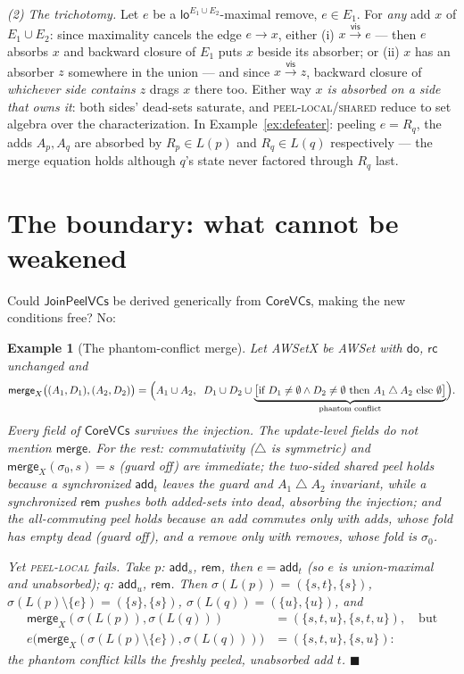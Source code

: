 \documentclass[11pt]{article}
\newtheorem{example}[theorem]{Example}
\newcommand{\vis}{\xrightarrow{\mathsf{vis}}}
\newcommand{\add}{\mathsf{add}}
\newcommand{\rem}{\mathsf{rem}}
\newcommand{\Merge}{\mathsf{merge}}
\newcommand{\Sinit}{\sigma_0}
\newcommand{\loE}[1]{\mathsf{lo}^{#1}}
\newcommand{\co}{\mathsf{CoreVCs}}
\newcommand{\jp}{\mathsf{JoinPeelVCs}}
\begin{document}
\emph{(2) The trichotomy.} Let $e$ be a $\loE{E_1\cup E_2}$-maximal
remove, $e \in E_1$. For \emph{any} add $x$ of $E_1 \cup E_2$: since
maximality cancels the edge $e \to x$, either
(i) $x \vis e$ --- then $e$ absorbs $x$ and backward closure of $E_1$
puts $x$ beside its absorber; or
(ii) $x$ has an absorber $z$ somewhere in the union --- and since
$x \vis z$, backward closure of \emph{whichever side contains $z$} drags
$x$ there too. Either way \emph{$x$ is absorbed on a side that owns it}:
both sides' dead-sets saturate, and \textsc{peel-local}/\textsc{shared}
reduce to set algebra over the characterization. In
Example~\ref{ex:defeater}: peeling $e = R_q$, the adds $A_p, A_q$ are
absorbed by $R_p \in L(p)$ and $R_q \in L(q)$ respectively --- the merge
equation holds although $q$'s state never factored through $R_q$ last.

\section{The boundary: what cannot be weakened}
\label{sec:boundary}

Could $\jp$ be derived generically from $\co$, making the new conditions
free? No:

\begin{example}[The phantom-conflict merge]
\label{ex:phantom}
Let \textsf{AWSetX} be \textsf{AWSet} with $\mathsf{do}$, $\mathsf{rc}$
unchanged and
\[
\Merge_X\bigl((A_1,D_1),(A_2,D_2)\bigr) =
\Bigl(A_1 \cup A_2,\;\; D_1 \cup D_2 \cup
\underbrace{\bigl[\text{if } D_1 \neq \emptyset \wedge D_2 \neq \emptyset
\text{ then } A_1 \mathbin{\triangle} A_2 \text{ else } \emptyset\bigr]}_{\text{phantom conflict}}\Bigr).
\]
Every field of $\co$ survives the injection. The update-level fields do
not mention $\Merge$. For the rest: commutativity ($\triangle$ is
symmetric) and $\Merge_X(\Sinit, s) = s$ (guard off) are immediate; the
two-sided shared peel holds because a synchronized $\add_t$ leaves the
guard and $A_1 \mathbin{\triangle} A_2$ \emph{invariant}, while a
synchronized $\rem$ pushes both added-sets into dead, \emph{absorbing}
the injection; and the all-commuting peel holds because an add commutes
only with adds, whose fold has empty dead (guard off), and a remove only
with removes, whose fold is $\Sinit$.

Yet \textsc{peel-local} fails. Take $p$: $\add_s$, $\rem$, then
$e = \add_t$ (so $e$ is union-maximal and unabsorbed); $q$: $\add_u$,
$\rem$. Then $\sigma(L(p)) = (\{s,t\},\{s\})$,
$\sigma(L(p){\setminus}\{e\}) = (\{s\},\{s\})$,
$\sigma(L(q)) = (\{u\},\{u\})$, and
\begin{align*}
\Merge_X(\sigma(L(p)), \sigma(L(q))) &= (\{s,t,u\}, \{s,t,u\}), \quad\text{but}\\
e\bigl(\Merge_X(\sigma(L(p){\setminus}\{e\}), \sigma(L(q)))\bigr)
&= (\{s,t,u\}, \{s,u\}) :
\end{align*}
the phantom conflict kills the freshly peeled, unabsorbed add $t$.
\hfill$\blacksquare$
\end{example}
\end{document}
